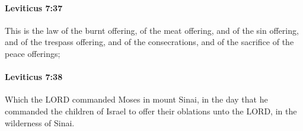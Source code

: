 		\paragraph{Leviticus 7:37} %
			\label{LEVITICUS-7-37}

			This is the law of the burnt offering, of the meat offering, and of the sin offering, and of the trespass offering, and of the consecrations, and of the sacrifice of the peace offerings;


		\paragraph{Leviticus 7:38} %
			\label{LEVITICUS-7-38}

			Which the LORD commanded Moses in mount Sinai, in the day that he commanded the children of Israel to offer their oblations unto the LORD, in the wilderness of Sinai.

